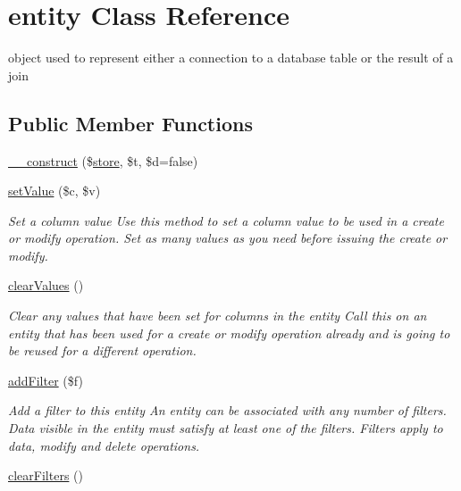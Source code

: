 \hypertarget{classentity}{}\section{entity Class Reference}
\label{classentity}


object used to represent either a connection to a database table or the result of a join  


\subsection*{Public Member Functions}
\begin{DoxyCompactItemize}
\item 
\hyperlink{classentity_a2411a96bf911703bf07e8bac90ffa7f7}{\+\_\+\+\_\+construct} (\$\hyperlink{classstore}{store}, \$t, \$d=false)
\item 
\hyperlink{classentity_a11cae02dda3cc8b9ad4966e33ef11a2a}{set\+Value} (\$c, \$v)
\begin{DoxyCompactList}\small\item\em Set a column value Use this method to set a column value to be used in a create or modify operation. Set as many values as you need before issuing the create or modify. \end{DoxyCompactList}\item 
\hypertarget{classentity_a7afa5fa5ccc2f9b9a0390cad59ecfede}{}\hyperlink{classentity_a7afa5fa5ccc2f9b9a0390cad59ecfede}{clear\+Values} ()\label{classentity_a7afa5fa5ccc2f9b9a0390cad59ecfede}

\begin{DoxyCompactList}\small\item\em Clear any values that have been set for columns in the entity Call this on an entity that has been used for a create or modify operation already and is going to be reused for a different operation. \end{DoxyCompactList}\item 
\hyperlink{classentity_a7041812e724f4d4e92f7350ac1ca4730}{add\+Filter} (\$f)
\begin{DoxyCompactList}\small\item\em Add a filter to this entity An entity can be associated with any number of filters. Data visible in the entity must satisfy at least one of the filters. Filters apply to data, modify and delete operations. \end{DoxyCompactList}\item 
\hypertarget{classentity_a3c82e6e7a3a2c79306206db541d2a343}{}\hyperlink{classentity_a3c82e6e7a3a2c79306206db541d2a343}{clear\+Filters} ()\label{classentity_a3c82e6e7a3a2c79306206db541d2a343}


\end{DoxyCompactItemize}
